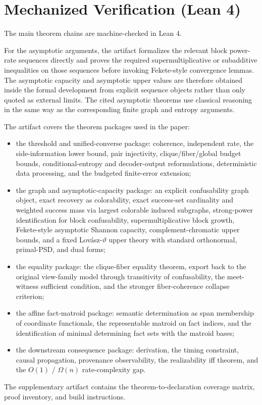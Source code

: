 \section*{Mechanized Verification (Lean 4)}\label{sec:lean}

The main theorem chains are machine-checked in Lean 4.

For the asymptotic arguments, the artifact formalizes the relevant block power-rate sequences directly and proves the required supermultiplicative or subadditive inequalities on those sequences before invoking Fekete-style convergence lemmas. The asymptotic capacity and asymptotic upper values are therefore obtained inside the formal development from explicit sequence objects rather than only quoted as external limits. The cited asymptotic theorems use classical reasoning in the same way as the corresponding finite graph and entropy arguments.

The artifact covers the theorem packages used in the paper:
\begin{itemize}
\item the threshold and unified-converse package: coherence, independent rate, the side-information lower bound, pair injectivity, clique/fiber/global budget bounds, conditional-entropy and decoder-output reformulations, deterministic data processing, and the budgeted finite-error extension;
\item the graph and asymptotic-capacity package: an explicit confusability graph object, exact recovery as colorability, exact success-set cardinality and weighted success mass via largest colorable induced subgraphs, strong-power identification for block confusability, supermultiplicative block growth, Fekete-style asymptotic Shannon capacity, complement-chromatic upper bounds, and a fixed Lov\'asz-$\vartheta$ upper theory with standard orthonormal, primal-PSD, and dual forms;
\item the equality package: the clique-fiber equality theorem, export back to the original view-family model through transitivity of confusability, the meet-witness sufficient condition, and the stronger fiber-coherence collapse criterion;
\item the affine fact-matroid package: semantic determination as span membership of coordinate functionals, the representable matroid on fact indices, and the identification of minimal determining fact sets with the matroid bases;
\item the downstream consequence package: derivation, the timing constraint, causal propagation, provenance observability, the realizability iff theorem, and the $O(1)$ / $\Omega(n)$ rate-complexity gap.
\end{itemize}

The supplementary artifact contains the theorem-to-declaration coverage matrix, proof inventory, and build instructions.
